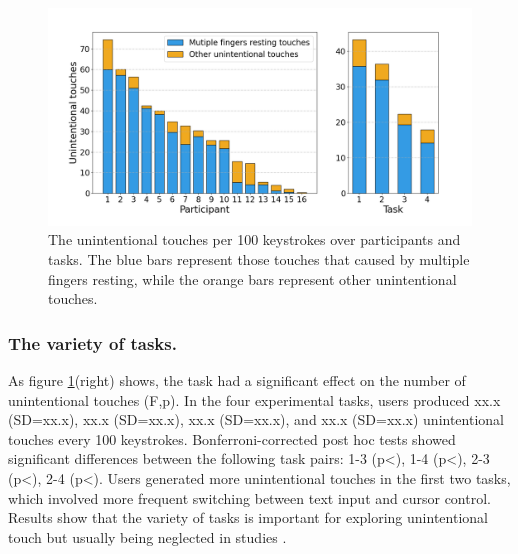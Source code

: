 \begin{figure}[!tbh]
	\includegraphics[width=1.0\linewidth]{figures/u_touches_over_user_task.png}
	\centering
	\caption{The unintentional touches per 100 keystrokes over participants and tasks. The blue bars represent those touches that caused by multiple fingers resting, while the orange bars represent other unintentional touches.}
	\label{fig:u_touches_over_user_task}
\end{figure}

\subsubsection{The variety of tasks.}

As figure \ref{fig:u_touches_over_user_task}(right) shows, the task had a significant effect on the number of unintentional touches (F,p). In the four experimental tasks, users produced xx.x (SD=xx.x), xx.x (SD=xx.x), xx.x (SD=xx.x), and xx.x (SD=xx.x) unintentional touches every 100 keystrokes. Bonferroni-corrected post hoc tests showed significant differences between the following task pairs: 1-3 (p<), 1-4 (p<), 2-3 (p<), 2-4 (p<). Users generated more unintentional touches in the first two tasks, which involved more frequent switching between text input and cursor control. Results show that the variety of tasks is important for exploring unintentional touch but usually being neglected in studies \cite{2013-TapBoard, 2020-TabletopTouch, 2014-PalmRejection}.


